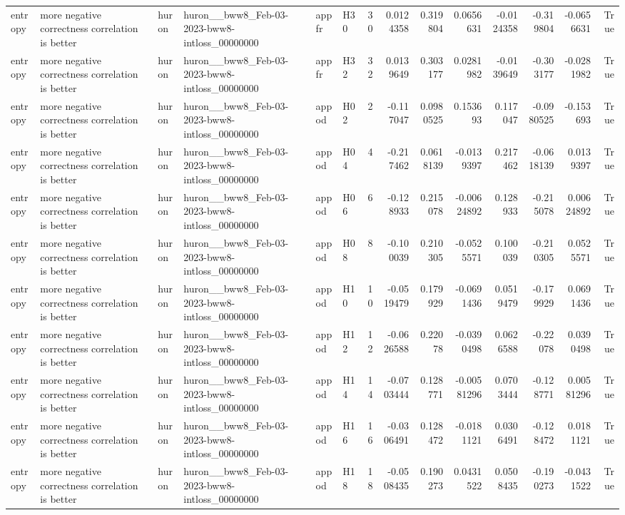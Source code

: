 \begin{longtable}{llllllrrrrrrrr}
entropy & more negative correctness correlation is better & huron & huron\_\_bww8\_Feb-03-2023-bww8-intloss\_00000000 & appfr & H30 & 30 & 0.0124358 & 0.319804 & 0.0656631 & -0.0124358 & -0.319804 & -0.0656631 & True \\
entropy & more negative correctness correlation is better & huron & huron\_\_bww8\_Feb-03-2023-bww8-intloss\_00000000 & appfr & H32 & 32 & 0.0139649 & 0.303177 & 0.0281982 & -0.0139649 & -0.303177 & -0.0281982 & True \\
entropy & more negative correctness correlation is better & huron & huron\_\_bww8\_Feb-03-2023-bww8-intloss\_00000000 & appod & H02 & 2 & -0.117047 & 0.0980525 & 0.153693 & 0.117047 & -0.0980525 & -0.153693 & True \\
entropy & more negative correctness correlation is better & huron & huron\_\_bww8\_Feb-03-2023-bww8-intloss\_00000000 & appod & H04 & 4 & -0.217462 & 0.0618139 & -0.0139397 & 0.217462 & -0.0618139 & 0.0139397 & True \\
entropy & more negative correctness correlation is better & huron & huron\_\_bww8\_Feb-03-2023-bww8-intloss\_00000000 & appod & H06 & 6 & -0.128933 & 0.215078 & -0.00624892 & 0.128933 & -0.215078 & 0.00624892 & True \\
entropy & more negative correctness correlation is better & huron & huron\_\_bww8\_Feb-03-2023-bww8-intloss\_00000000 & appod & H08 & 8 & -0.100039 & 0.210305 & -0.0525571 & 0.100039 & -0.210305 & 0.0525571 & True \\
entropy & more negative correctness correlation is better & huron & huron\_\_bww8\_Feb-03-2023-bww8-intloss\_00000000 & appod & H10 & 10 & -0.0519479 & 0.179929 & -0.0691436 & 0.0519479 & -0.179929 & 0.0691436 & True \\
entropy & more negative correctness correlation is better & huron & huron\_\_bww8\_Feb-03-2023-bww8-intloss\_00000000 & appod & H12 & 12 & -0.0626588 & 0.22078 & -0.0390498 & 0.0626588 & -0.22078 & 0.0390498 & True \\
entropy & more negative correctness correlation is better & huron & huron\_\_bww8\_Feb-03-2023-bww8-intloss\_00000000 & appod & H14 & 14 & -0.0703444 & 0.128771 & -0.00581296 & 0.0703444 & -0.128771 & 0.00581296 & True \\
entropy & more negative correctness correlation is better & huron & huron\_\_bww8\_Feb-03-2023-bww8-intloss\_00000000 & appod & H16 & 16 & -0.0306491 & 0.128472 & -0.0181121 & 0.0306491 & -0.128472 & 0.0181121 & True \\
entropy & more negative correctness correlation is better & huron & huron\_\_bww8\_Feb-03-2023-bww8-intloss\_00000000 & appod & H18 & 18 & -0.0508435 & 0.190273 & 0.0431522 & 0.0508435 & -0.190273 & -0.0431522 & True \\

\end{longtable}

